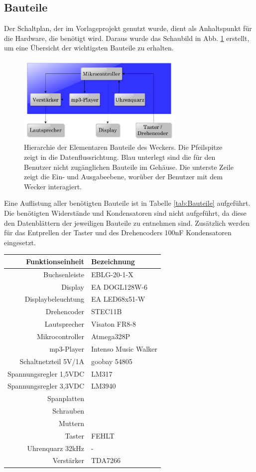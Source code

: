 \documentclass[journal, a4paper]{IEEEtran}
\begin{document}
	\subsection{Bauteile}
		\label{sc:Hardware:subsc:Bauteile}
		Der Schaltplan, der im Vorlageprojekt genutzt wurde, dient als Anhaltspunkt für die Hardware, die benötigt wird. Daraus wurde das Schaubild in Abb. \ref{fig:Hierarchie} erstellt, um eine Übersicht der wichtigsten Bauteile zu erhalten.
		\begin{figure}
				\includegraphics[width=80mm]{./Grafiken/Hierarchie}
				\caption{Hierarchie der Elementaren Bauteile des Weckers. Die Pfeilspitze zeigt in die Datenflussrichtung. Blau unterlegt sind die für den Benutzer nicht zugänglichen Bauteile im Gehäuse. Die unterste Zeile zeigt die Ein- und Ausgabeebene, worüber der Benutzer mit dem Wecker interagiert.}
				\label{fig:Hierarchie}
		\end{figure} 
		Eine Auflistung aller benötigten Bauteile ist in Tabelle \ref{tab:Bauteile} aufgeführt. Die benötigten Widerstände und Kondensatoren sind nicht aufgeführt, da diese den Datenblättern der jeweiligen Bauteile zu entnehmen sind. Zusätzlich werden für das Entprellen der Taster und des Drehencoders 100nF Kondensatoren eingesetzt.
		\begin{center}
			\begin{tabular}{rl}
				\toprule
				Funktionseinheit & Bezeichnung \\
				\midrule
				Buchsenleiste & EBLG-20-1-X\\
				Display & EA DOGL128W-6 \\
				Displaybeleuchtung & EA LED68x51-W\\
				Drehencoder & STEC11B \\
				Lautsprecher & Visaton FR8-8 \\
				Mikrocontroller & Atmega328P \\
				mp3-Player & Intenso Music Walker \\
				Schaltnetzteil 5V/1A & goobay 54805 \\
				Spannungsregler 1,5VDC & LM317\\
				Spannungsregler 3,3VDC & LM3940 \\
				Spanplatten & \\
				Schrauben &\\
				Muttern&\\
				Taster & FEHLT \\
				Uhrenquarz 32kHz& - \\			
				Verstärker & TDA7266 \\
				\bottomrule		
			\end{tabular}
			\label{tab:Bauteile}
		\end{center}
\end{document}
